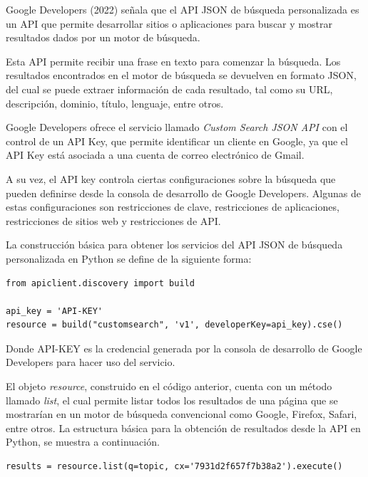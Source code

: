 Google Developers (2022) señala que el API JSON de búsqueda personalizada es un API que permite desarrollar sitios o aplicaciones para buscar y mostrar resultados dados por un motor de búsqueda.

Esta API permite recibir una frase en texto para comenzar la búsqueda. Los resultados encontrados en el motor de búsqueda se devuelven en formato JSON, del cual se puede extraer información de cada resultado, tal como su URL, descripción, dominio, título, lenguaje, entre otros.

Google Developers ofrece el servicio llamado \textit{Custom Search JSON API} con el control de un API Key, que permite identificar un cliente en Google, ya que el API Key está asociada a una cuenta de correo electrónico de Gmail.

A su vez, el API key controla ciertas configuraciones sobre la búsqueda que pueden definirse desde la consola de desarrollo de Google Developers. Algunas de estas configuraciones son restricciones de clave, restricciones de aplicaciones, restricciones de sitios web y restricciones de API.

La construcción básica para obtener los servicios del API JSON de búsqueda personalizada en Python se define de la siguiente forma:

\begin{tcolorbox}[colback=white!25!white,colframe=blue]
  \begin{verbatim}
from apiclient.discovery import build

api_key = 'API-KEY'
resource = build("customsearch", 'v1', developerKey=api_key).cse()
  \end{verbatim}
\end{tcolorbox}

Donde API-KEY es la credencial generada por la consola de desarrollo de Google Developers para hacer uso del servicio.

El objeto \textit{resource}, construido en el código anterior, cuenta con un método llamado \textit{list}, el cual permite listar todos los resultados de una página que se mostrarían en un motor de búsqueda convencional como Google, Firefox, Safari, entre otros. La estructura básica para la obtención de resultados desde la API en Python, se muestra a continuación.

\begin{tcolorbox}[colback=white!25!white,colframe=blue]
  \begin{verbatim}
results = resource.list(q=topic, cx='7931d2f657f7b38a2').execute()
  \end{verbatim}
\end{tcolorbox}

